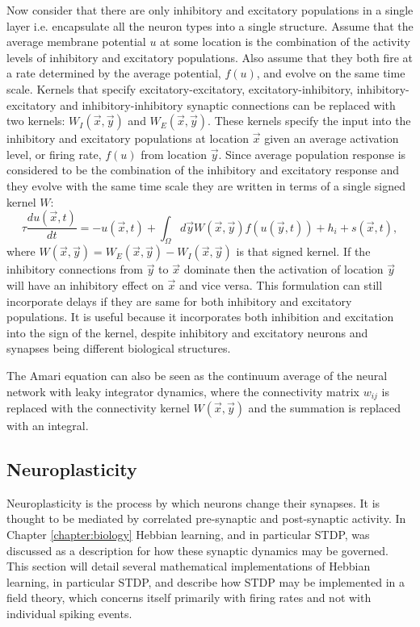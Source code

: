 Now consider that there are only inhibitory and excitatory populations in a single layer i.e. encapsulate all the neuron types into a single structure. Assume that the average membrane potential $u$ at some location is the combination of the activity levels of inhibitory and excitatory populations. Also assume that they both fire at a rate determined by the average potential, $f(u)$, and evolve on the same time scale. Kernels that specify excitatory-excitatory, excitatory-inhibitory, inhibitory-excitatory and inhibitory-inhibitory synaptic connections can be replaced with two kernels: $W_I(\vec{x},\vec{y})$ and $W_E(\vec{x},\vec{y})$. These kernels specify the input into the inhibitory and excitatory populations at location $\vec{x}$ given an average activation level, or firing rate, $f(u)$ from location $\vec{y}$. Since average population response is considered to be the combination of the inhibitory and excitatory response and they evolve with the same time scale they are written in terms of a single signed kernel $W$:
\begin{equation} \label{ch2Amari2}
\tau \frac{du(\vec{x},t)}{dt} = - u(\vec{x},t) + \int_{\Omega} d\vec{y} W(\vec{x},\vec{y}) f(u(\vec{y},t)) + h_i + s(\vec{x},t),
\end{equation}
where $W(\vec{x},\vec{y})= W_E(\vec{x},\vec{y})-W_I(\vec{x},\vec{y})$ is that signed kernel. If the inhibitory connections from $\vec{y}$ to $\vec{x}$ dominate then the activation of location $\vec{y}$ will have an inhibitory effect on $\vec{x}$ and vice versa. This formulation can still incorporate delays if they are same for both inhibitory and excitatory populations. It is useful because it incorporates both inhibition and excitation into the sign of the kernel, despite inhibitory and excitatory neurons and synapses being different biological structures.

The Amari equation can also be seen as the continuum average of the neural network with leaky integrator dynamics, where the connectivity matrix $w_{ij}$ is replaced with the connectivity kernel $W(\vec{x},\vec{y})$ and the summation is replaced with an integral.
\subsection{Neuroplasticity}
Neuroplasticity is the process by which neurons change their synapses. It is thought to be mediated by correlated pre-synaptic and post-synaptic activity. In Chapter \ref{chapter:biology} Hebbian learning, and in particular STDP, was discussed as a description for how these synaptic dynamics may be governed. This section will detail several mathematical implementations of Hebbian learning, in particular STDP, and describe how STDP may be implemented in a field theory, which concerns itself primarily with firing rates and not with individual spiking events.
